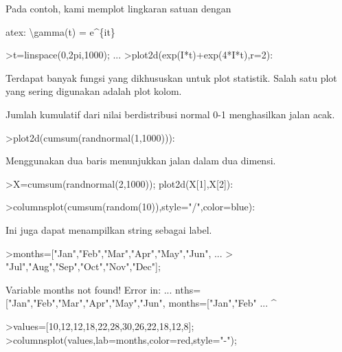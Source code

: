 \documentclass[a4paper,10pt]{article}
\begin{document}
\begin{eulernotebook}
\begin{eulercomment}
\begin{eulercomment}
\begin{eulercomment}
\begin{eulercomment}
\begin{eulercomment}
\begin{eulercomment}
\begin{eulercomment}
\begin{eulercomment}
\begin{eulercomment}
\begin{eulercomment}
\begin{eulercomment}
Pada contoh, kami memplot lingkaran satuan dengan


atex: \textbackslash{}gamma(t) = e\textasciicircum{}\{it\}
\end{eulercomment}
\begin{eulerprompt}
>t=linspace(0,2pi,1000); ...
>plot2d(exp(I*t)+exp(4*I*t),r=2):
\end{eulerprompt}
\begin{eulercomment}
Terdapat banyak fungsi yang dikhususkan untuk plot statistik. Salah
satu plot yang sering digunakan adalah plot kolom.

Jumlah kumulatif dari nilai berdistribusi normal 0-1 menghasilkan
jalan acak.
\end{eulercomment}
\begin{eulerprompt}
>plot2d(cumsum(randnormal(1,1000))):
\end{eulerprompt}
\begin{eulercomment}
Menggunakan dua baris menunjukkan jalan dalam dua dimensi.
\end{eulercomment}
\begin{eulerprompt}
>X=cumsum(randnormal(2,1000)); plot2d(X[1],X[2]):
\end{eulerprompt}
\begin{eulerprompt}
>columnsplot(cumsum(random(10)),style="/",color=blue):
\end{eulerprompt}
\begin{eulercomment}
Ini juga dapat menampilkan string sebagai label.
\end{eulercomment}
\begin{eulerprompt}
>months=["Jan","Feb","Mar","Apr","May","Jun", ...
>  "Jul","Aug","Sep","Oct","Nov","Dec"];
\end{eulerprompt}
\begin{euleroutput}
  Variable months not found!
  Error in:
  ... nths=["Jan","Feb","Mar","Apr","May","Jun", months=["Jan","Feb" ...
                                                       ^
\end{euleroutput}
\begin{eulerprompt}
>values=[10,12,12,18,22,28,30,26,22,18,12,8];
>columnsplot(values,lab=months,color=red,style="-");
\end{eulerprompt}
\begin{euleroutput}

\end{euleroutput}
\end{eulercomment}
\end{eulercomment}
\end{eulercomment}
\end{eulercomment}
\end{eulercomment}
\end{eulercomment}
\end{eulercomment}
\end{eulercomment}
\end{eulercomment}
\end{eulercomment}
\end{eulernotebook}
\end{document}
